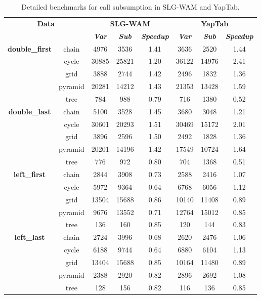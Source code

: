 \begin{table}[ht]
\centering
\footnotesize{
  \begin{tabular}{cc|ccc|ccc}
   \hline
    \hline
    \multicolumn{2}{c|}{\multirow{2}{*}{\small{\textbf{Data}}}} & \multicolumn{3}{c|}{\small{\textbf{SLG-WAM}}} & \multicolumn{3}{c}{\small{\textbf{YapTab}}} \\
     \multicolumn{2}{c|}{} & \textbf{\textit{Var}} & \textbf{\textit{Sub}} & \textbf{\textit{Speedup}} & \textbf{\textit{Var}} & \textbf{\textit{Sub}} & \textbf{\textit{Speedup}} \\
   \hline
   \hline
\multirow{5}{*}{\textbf{double\_first}} &  \scriptsize{chain}  &  4976 & 3536 &  1.41  & 3636 & 2520 &  1.44 \\
&  \scriptsize{cycle}  &  30885 & 25821 &  1.20  & 36122 & 14976 &  2.41 \\
&  \scriptsize{grid}  &  3888 & 2744 &  1.42  & 2496 & 1832 &  1.36 \\
&  \scriptsize{pyramid}  &  20281 & 14212 &  1.43  & 21353 & 13428 &  1.59 \\
&  \scriptsize{tree}  &  784 & 988 &  0.79  & 716 & 1380 &  0.52 \\
\hline
\multirow{5}{*}{\textbf{double\_last}} &  \scriptsize{chain}  &  5100 & 3528 &  1.45  & 3680 & 3048 &  1.21 \\
&  \scriptsize{cycle}  &  30601 & 20293 &  1.51  & 30469 & 15172 &  2.01 \\
&  \scriptsize{grid}  &  3896 & 2596 &  1.50  & 2492 & 1828 &  1.36 \\
&  \scriptsize{pyramid}  &  20201 & 14196 &  1.42  & 17549 & 10724 &  1.64 \\
&  \scriptsize{tree}  &  776 & 972 &  0.80  & 704 & 1368 &  0.51 \\
\hline
\multirow{5}{*}{\textbf{left\_first}} &  \scriptsize{chain}  &  2844 & 3908 &  0.73  & 2588 & 2416 &  1.07 \\
&  \scriptsize{cycle}  &  5972 & 9364 &  0.64  & 6768 & 6056 &  1.12 \\
&  \scriptsize{grid}  &  13504 & 15688 &  0.86  & 10140 & 11408 &  0.89 \\
&  \scriptsize{pyramid}  &  9676 & 13552 &  0.71  & 12764 & 15012 &  0.85 \\
&  \scriptsize{tree}  &  136 & 160 &  0.85  & 120 & 144 &  0.83 \\
\hline
\multirow{5}{*}{\textbf{left\_last}} &  \scriptsize{chain}  &  2724 & 3996 &  0.68  & 2620 & 2476 &  1.06 \\
&  \scriptsize{cycle}  &  6188 & 9744 &  0.64  & 6880 & 6104 &  1.13 \\
&  \scriptsize{grid}  &  13404 & 15688 &  0.85  & 10164 & 11480 &  0.89 \\
&  \scriptsize{pyramid}  &  2388 & 2920 &  0.82  & 2896 & 2692 &  1.08 \\
&  \scriptsize{tree}  &  128 & 156 &  0.82  & 116 & 136 &  0.85 \\
\hline
\hline
\end{tabular}
}
\caption{Detailed benchmarks for call subsumption in SLG-WAM and YapTab.}
\label{tbl:result_path_detail1}
\end{table}


